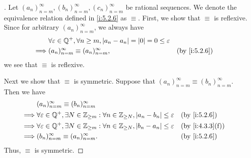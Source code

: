 \begin{proof}[]
  Let \((a_n)_{n = m}^\infty, (b_n)_{n = m}^\infty, (c_n)_{n = m}^\infty\) be rational sequences.
  We denote the equivalence relation defined in \cref{i:5.2.6} as \(\equiv\).
  First, we show that \(\equiv\) is reflexive.
  Since for arbitrary \((a_n)_{n = m}^\infty\), we always have
  \begin{align*}
             & \forall \varepsilon \in \Q^+, \forall n \geq m, \abs{a_n - a_n} = \abs{0} = 0 \leq \varepsilon                   \\
    \implies & (a_n)_{n = m}^\infty \equiv (a_n)_{n = m}^\infty,                                              &  & \by{i:5.2.6}
  \end{align*}
  we see that \(\equiv\) is reflexive.

  Next we show that \(\equiv\) is symmetric.
  Suppose that \((a_n)_{n = m}^\infty \equiv (b_n)_{n = m}^\infty\).
  Then we have
  \begin{align*}
             & (a_n)_{n = m}^\infty \equiv (b_n)_{n = m}^\infty                                                                                          \\
    \implies & \forall \varepsilon \in \Q^+, \exists N \in \Z_{\geq m}: \forall n \in \Z_{\geq N}, \abs{a_n - b_n} \leq \varepsilon &  & \by{i:5.2.6}    \\
    \implies & \forall \varepsilon \in \Q^+, \exists N \in \Z_{\geq m}: \forall n \in \Z_{\geq N}, \abs{b_n - a_n} \leq \varepsilon &  & \by{i:4.3.3}[f] \\
    \implies & (b_n)_{n = m}^\infty \equiv (a_n)_{n = m}^\infty.                                                                    &  & \by{i:5.2.6}
  \end{align*}
  Thus, \(\equiv\) is symmetric.


\end{proof}
